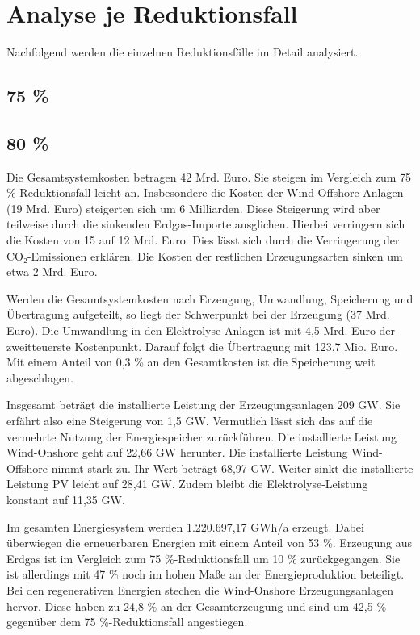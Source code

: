 \section{Analyse je Reduktionsfall}
Nachfolgend werden die einzelnen Reduktionsfälle im Detail analysiert.

\subsection{75 \%}

\subsection{80 \%}
Die Gesamtsystemkosten betragen 42 Mrd. Euro. Sie steigen im Vergleich zum 75 \%-Reduktionsfall leicht an. Insbesondere die Kosten der Wind-Offshore-Anlagen (19 Mrd. Euro) steigerten sich um 6 Milliarden. Diese Steigerung wird aber teilweise durch die sinkenden Erdgas-Importe ausglichen. Hierbei verringern sich die Kosten von 15 auf 12 Mrd. Euro. Dies lässt sich durch die Verringerung der CO₂-Emissionen erklären. Die Kosten der restlichen Erzeugungsarten sinken um etwa 2 Mrd. Euro.

Werden die Gesamtsystemkosten nach Erzeugung, Umwandlung, Speicherung und Übertragung aufgeteilt, so liegt der Schwerpunkt bei der Erzeugung (37 Mrd. Euro). Die Umwandlung in den Elektrolyse-Anlagen ist mit 4,5 Mrd. Euro der zweitteuerste Kostenpunkt. Darauf folgt die Übertragung mit 123,7 Mio. Euro. Mit einem Anteil von 0,3 \% an den Gesamtkosten ist die Speicherung weit abgeschlagen.

Insgesamt beträgt die installierte Leistung der Erzeugungsanlagen 209 GW. Sie erfährt also eine Steigerung von 1,5 GW. Vermutlich lässt sich das auf die vermehrte Nutzung der Energiespeicher zurückführen. Die installierte Leistung Wind-Onshore geht auf 22,66 GW herunter. Die installierte Leistung Wind-Offshore nimmt stark zu. Ihr Wert beträgt 68,97 GW.  Weiter sinkt die installierte Leistung PV leicht auf 28,41 GW. Zudem bleibt die Elektrolyse-Leistung konstant auf 11,35 GW. 

Im gesamten Energiesystem werden 1.220.697,17 GWh/a erzeugt. Dabei überwiegen die erneuerbaren Energien mit einem Anteil von 53 \%. Erzeugung aus Erdgas ist im Vergleich zum 75 \%-Reduktionsfall um 10 \% zurückgegangen. Sie ist allerdings mit 47 \% noch im hohen Maße an der Energieproduktion beteiligt. Bei den regenerativen Energien stechen die Wind-Onshore Erzeugungsanlagen hervor. Diese haben zu 24,8 \% an der Gesamterzeugung und sind um 42,5 \% gegenüber dem 75 \%-Reduktionsfall angestiegen. 

